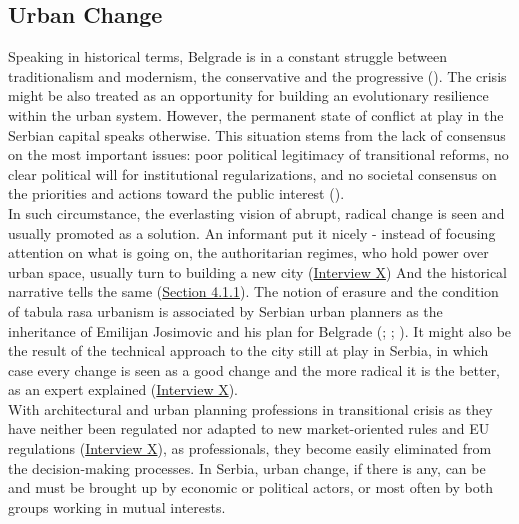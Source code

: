 \documentclass[11pt]{report}
\begin{document}
{{{\subsection{Urban Change}

Speaking in historical terms, Belgrade is in a constant struggle between traditionalism and modernism, the conservative and the progressive (\href{Roter}{\cite{doytchinov_modernization_2015}}).
The crisis might be also treated as an opportunity for building an evolutionary resilience within the urban system.
However, the permanent state of conflict at play in the Serbian capital speaks otherwise.
This situation stems from the lack of consensus on the most important issues: poor political legitimacy of transitional reforms, no clear political will for institutional regularizations,  and no societal consensus on the priorities and actions toward the public interest 
(\href{Vujoseivc}{\citealt{vujosevic_postsocijalisticka_2010}}).
\\

In such circumstance, the everlasting vision of abrupt, radical change is seen and usually promoted as a solution.   
An informant put it nicely - instead of focusing attention on what is going on, the authoritarian regimes, who hold power over urban space, usually turn to building a new city
(\href{InterviewX}{Interview X})
And the historical narrative tells the same (\href{Section 4.1.1}{Section 4.1.1}).
The notion of erasure and the condition of tabula rasa urbanism is associated by Serbian urban planners as the inheritance of Emilijan Josimovic and his plan for Belgrade (\href{Maksimovic}{\citealt{maksimovic_idejni_1978}}; \href{Perovic}{\citealt{perovic_iskustva_2008}}; \href{Blagojevic}{\citealt{blagojevic_urban_2009}}).
It might also be the result of the technical approach to the city still at play in Serbia, in which case every change is seen as a good change and the more radical it is the better, as an expert explained
(\href{InterviewX}{Interview X}).
\\

With architectural and urban planning professions in transitional crisis as they have neither been regulated nor adapted to new market-oriented rules and EU regulations
(\href{InterviewX}{Interview X}),
as professionals, they become easily eliminated from the decision-making processes.
In Serbia, urban change, if there is any, can be and must be brought up by economic or political actors, or most often by both groups working in mutual interests.
\\

}}}
\end{document}
